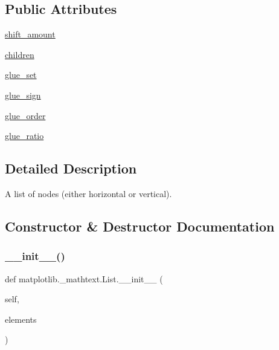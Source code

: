 \subsection*{Public Attributes}
\begin{DoxyCompactItemize}
\item 
\hyperlink{classmatplotlib_1_1__mathtext_1_1List_aeae99cb9550d317971f81d8f4afbad99}{shift\+\_\+amount}
\item 
\hyperlink{classmatplotlib_1_1__mathtext_1_1List_ae6ac4a20d5d59414cae13556dbdcecfe}{children}
\item 
\hyperlink{classmatplotlib_1_1__mathtext_1_1List_a8a1368421669141cec1e62c64b77af68}{glue\+\_\+set}
\item 
\hyperlink{classmatplotlib_1_1__mathtext_1_1List_a2ee99a593774e89a0de554e9b2ae84f8}{glue\+\_\+sign}
\item 
\hyperlink{classmatplotlib_1_1__mathtext_1_1List_a1d9d2b1d05947c2eb69753068852ac0d}{glue\+\_\+order}
\item 
\hyperlink{classmatplotlib_1_1__mathtext_1_1List_a80caeef3d87f53b95d571797600e999e}{glue\+\_\+ratio}
\end{DoxyCompactItemize}


\subsection{Detailed Description}
\begin{DoxyVerb}A list of nodes (either horizontal or vertical).\end{DoxyVerb}
 

\subsection{Constructor \& Destructor Documentation}
\mbox{\label{classmatplotlib_1_1__mathtext_1_1List_af0034c8f7594a9f29db2db77776e205c}} 
\subsubsection{\texorpdfstring{\+\_\+\+\_\+init\+\_\+\+\_\+()}{\_\_init\_\_()}}
{\footnotesize\ttfamily def matplotlib.\+\_\+mathtext.\+List.\+\_\+\+\_\+init\+\_\+\+\_\+ (\begin{DoxyParamCaption}\item[{}]{self,  }\item[{}]{elements }\end{DoxyParamCaption})}



